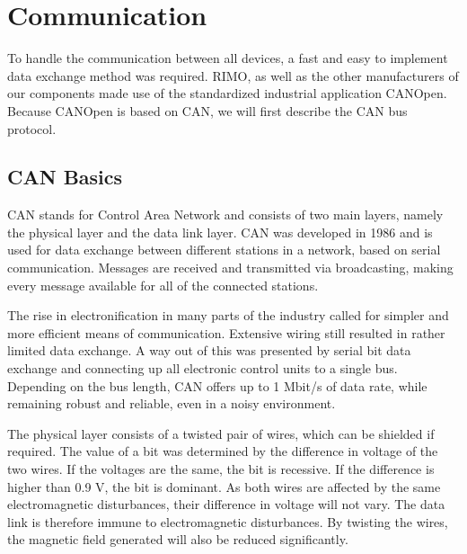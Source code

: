 
\chapter{Communication}
\label{chp:Communication}

To handle the communication between all devices, a fast and easy to implement data exchange method was required. RIMO, as well as the other manufacturers of our components made use of the standardized industrial application CANOpen. Because CANOpen is based on CAN, we will first describe the CAN bus protocol.

\section{CAN Basics}


CAN stands for Control Area Network and consists of two main layers, namely the physical layer and the data link layer. CAN was developed in 1986 and is used for data exchange between different stations in a network, based on serial communication. Messages are received and transmitted via broadcasting, making every message available for all of the connected stations. 

The rise in electronification in many parts of the industry called for simpler and more efficient means of communication. Extensive wiring still resulted in rather limited data exchange. A way out of this was presented by serial bit data exchange and connecting up all electronic control units to a single bus. Depending on the bus length, CAN offers up to 1 Mbit/s of data rate, while remaining robust and reliable, even in a noisy environment.

The physical layer consists of a twisted pair of wires, which can be shielded if required. The value of a bit was determined by the difference in voltage of the two wires. If the voltages are the same, the bit is recessive. If the difference is higher than 0.9 V, the bit is dominant. As both wires are affected by the same electromagnetic disturbances, their difference in voltage will not vary. The data link is therefore immune to electromagnetic disturbances. By twisting the wires, the magnetic field generated will also be reduced significantly.


